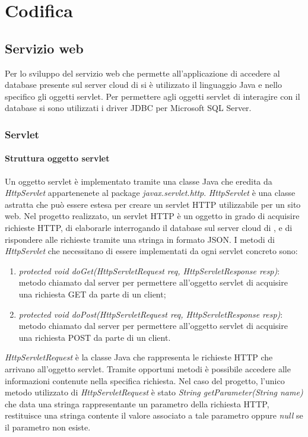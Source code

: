 \chapter{Codifica}

\section{Servizio web}

Per lo sviluppo del servizio web che permette all'applicazione di accedere al database presente sul server cloud di \visione{} si è utilizzato il linguaggio Java e nello specifico gli oggetti servlet. Per permettere agli oggetti servlet di interagire con il database si sono utilizzati i driver JDBC per Microsoft SQL Server. 

\subsection{Servlet}

\subsubsection{Struttura oggetto servlet}

Un oggetto servlet è implementato tramite una classe Java che eredita da \textit{HttpServlet} appartenenete al package \textit{javax.servlet.http}. \textit{HttpServlet} è una classe astratta che può essere estesa per creare un servlet HTTP utilizzabile per un sito web. Nel progetto realizzato, un servlet HTTP è un oggetto in grado di acquisire richieste HTTP, di elaborarle interrogando il database sul server cloud di \visione{}, e di rispondere alle richieste tramite una stringa in formato JSON. I metodi di \textit{HttpServlet} che necessitano di essere implementati da ogni servlet concreto sono:
\begin{enumerate}
	\item \textit{protected void doGet(HttpServletRequest req, HttpServletResponse resp)}: metodo chiamato dal server per permettere all'oggetto servlet di acquisire una richiesta GET da parte di un client;
	\item \textit{protected void doPost(HttpServletRequest req, HttpServletResponse resp)}: metodo chiamato dal server per permettere all'oggetto servlet di acquisire una richiesta POST da parte di un client.
\end{enumerate}

\textit{HttpServletRequest} è la classe Java che rappresenta le richieste HTTP che arrivano all'oggetto servlet. Tramite opportuni metodi è possibile accedere alle informazioni contenute nella specifica richiesta. Nel caso del progetto, l'unico metodo utilizzato di \textit{HttpServletRequest} è stato \textit{String getParameter(String name)} che data una stringa rappresentante un parametro della richiesta HTTP, restituisce una stringa contente il valore associato a tale parametro oppure \textit{null} se il parametro non esiste.

